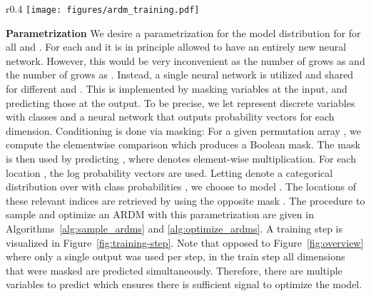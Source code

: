 \documentclass{article} \usepackage{iclr2022_conference,times}
\begin{document}
\begin{wrapfigure}{r}{0.4\textwidth}
    \centering
    \vspace{-.2cm}
    \texttt{[image: figures/ardm\_training.pdf]}
    \vspace{-.1cm}
    \caption{ARDM training step. This step optimizes for step  for all possible permutations  simultaneously which satisfy .}
    \label{fig:training-step}
    \vspace{-.3cm}
\end{wrapfigure}

\textbf{Parametrization} \hspace{.2cm}
We desire a parametrization for the model distribution  for  for all  and . For each  and  it is in principle allowed to have an entirely new neural network. However, this would be very inconvenient as the number of  grows as  and the number of  grows as . Instead, a single neural network is utilized and shared for different  and . This is implemented by masking variables at the input, and predicting those at the output. To be precise, we let  represent discrete variables with  classes and a neural network  that outputs probability vectors for each dimension. Conditioning is done via masking: For a given permutation array , we compute the elementwise comparison  which produces a Boolean mask. The mask is then used by predicting , where  denotes element-wise multiplication. For each location , the log probability vectors  are used. Letting  denote a categorical distribution over  with class probabilities , we choose to model . The locations of these relevant indices  are retrieved by using the opposite mask . The procedure to sample and optimize an ARDM with this parametrization are given in Algorithms~\ref{alg:sample_ardms} and \ref{alg:optimize_ardms}. A training step is visualized in Figure~\ref{fig:training-step}. Note that opposed to Figure~\ref{fig:overview} where only a single output was used per step, in the train step all dimensions that were masked are predicted simultaneously. Therefore, there are multiple variables to predict which ensures there is sufficient signal to optimize the model.
\end{document}

